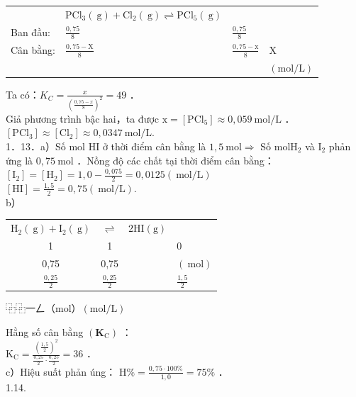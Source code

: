 \documentclass[10pt]{article}
\begin{document}
\begin{center}
\begin{tabular}{llll}
 & $\mathrm{PCl}_{3}(\mathrm{~g})+\mathrm{Cl}_{2}(\mathrm{~g}) \rightleftharpoons \mathrm{PCl}_{5}(\mathrm{~g})$ &  &  \\
Ban đầu: & $\frac{0,75}{8}$ & $\frac{0,75}{8}$ &  \\
Cân bằng: & $\frac{0,75-\mathrm{X}}{8}$ & $\frac{0,75-\mathrm{x}}{8}$ & X \\
 &  &  & $(\mathrm{mol} / \mathrm{L})$ \\
\end{tabular}
\end{center}

Ta có：$K_{C}=\frac{x}{\left(\frac{0,75-x}{8}\right)^{2}}=49$ ．\\
Giả phương trình bậc hai，ta được $\mathrm{x}=\left[\mathrm{PCl}_{5}\right] \approx 0,059 \mathrm{~mol} / \mathrm{L}$ ．\\
$\left[\mathrm{PCl}_{3}\right] \approx\left[\mathrm{Cl}_{2}\right] \approx 0,0347 \mathrm{~mol} / \mathrm{L}$.\\
1．13．a）Số mol HI ở thời điểm cân bằng là $1,5 \mathrm{~mol} \Rightarrow$ Số $\mathrm{mol} \mathrm{H}_{2}$ và $\mathrm{I}_{2}$ phản ứng là $0,75 \mathrm{~mol}$ ．Nồng độ các chất tại thời điểm cân bằng：\\
$\left[\mathrm{I}_{2}\right]=\left[\mathrm{H}_{2}\right]=1,0-\frac{0,075}{2}=0,0125(\mathrm{~mol} / \mathrm{L})$\\
$[\mathrm{HI}]=\frac{1,5}{2}=0,75(\mathrm{~mol} / \mathrm{L})$.\\
b）

\begin{center}
\begin{tabular}{cccl}
$\mathrm{H}_{2}(\mathrm{~g})+\mathrm{I}_{2}(\mathrm{~g})$ & $\rightleftharpoons$ & $2 \mathrm{HI}(\mathrm{g})$ &  \\
1 & 1 &  & 0 \\
0,75 & 0,75 &  & $(\mathrm{~mol})$ \\
$\frac{0,25}{2}$ & $\frac{0,25}{2}$ &  & $\frac{1,5}{2}$ \\
\end{tabular}
\end{center}$⿻ ⿻ 一 𠃋$（mol）$(\mathrm{mol} / \mathrm{L})$

Hằng số cân bằng $\left(\mathbf{K}_{\mathrm{C}}\right)$ ：\\
$\mathrm{K}_{\mathrm{C}}=\frac{\left(\frac{1,5}{2}\right)^{2}}{\frac{0,25}{2} \cdot \frac{0,25}{2}}=36$ ．\\
c）Hiệu suất phản úng： $\mathrm{H} \%=\frac{0,75 \cdot 100 \%}{1,0}=75 \%$ ．\\
1.14.
\end{document}
